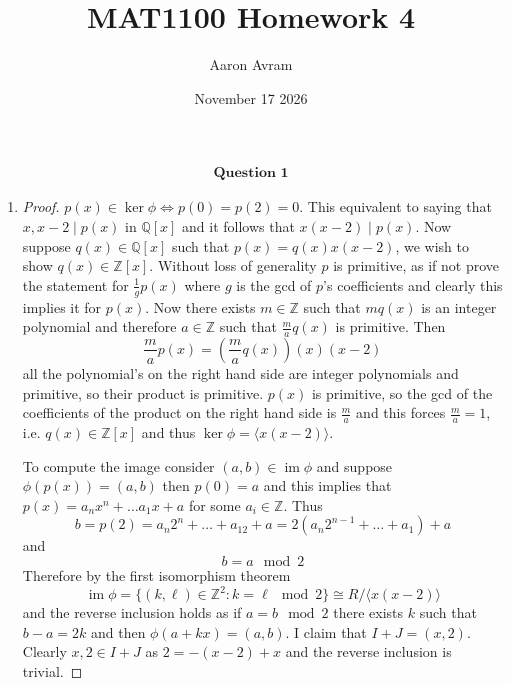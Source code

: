 \documentclass[12pt]{article}
\title{MAT1100 Homework 4}
\author{Aaron Avram}
\date{November 17 2026}
\begin{document}
\newtheorem{definition}{Definition}
\newtheorem{theorem}{Theorem}
\newtheorem{claim}{Claim}
\newtheorem{corollary}{Corollary}

\maketitle

\begin{align*}
    \textbf{Question 1}
\end{align*}

\begin{enumerate}
    \item[(i)]
    \begin{proof}
        $p(x) \in \ker \phi \iff p(0) = p(2) = 0$. This equivalent to saying
        that $x, x-2 \mid p(x)$ in $\mathbb Q[x]$ and it follows
        that $x(x-2) \mid p(x)$. Now suppose $q(x) \in \mathbb Q[x]$
        such that $p(x) = q(x)x(x-2)$, we wish to show $q(x) \in \mathbb Z[x]$. Without loss of generality $p$ is primitive,
        as if not prove the statement for $\frac{1}{g}p(x)$ where $g$ is the gcd of $p$'s
        coefficients and clearly this implies it for $p(x)$. Now there exists $m \in \mathbb Z$
        such that $mq(x)$ is an integer polynomial and therefore $a \in \mathbb Z$ such that
        $\frac{m}{a}q(x)$ is primitive. Then
        \[ \frac{m}{a}p(x) = (\frac{m}{a}q(x))(x)(x-2) \]
        all the polynomial's on the right hand side are integer polynomials and primitive, so their product is primitive.
        $p(x)$ is primitive, so the gcd of the coefficients of the product on the right hand side is $\frac{m}{a}$
        and this forces $\frac{m}{a} = 1$, i.e. $q(x) \in \mathbb Z[x]$ and thus $\ker \phi = \langle x(x-2) \rangle$.

        To compute the image consider $(a, b) \in \operatorname{im} \phi$ and suppose $\phi(p(x)) = (a, b)$
        then $p(0) = a$ and this implies that $p(x) = a_nx^n + \ldots a_1x + a$ for some $a_i \in \mathbb Z$.
        Thus
        \[ b = p(2) = a_n2^n + \ldots + a_12 + a = 2(a_n2^{n-1} + \ldots + a_1) + a \]
        and
        \[ b = a \mod 2 \]
        Therefore by the first isomorphism theorem
        \[ \operatorname{im} \phi = \{ (k, \ell) \in \mathbb Z^2 : k = \ell \mod 2 \} \cong R/\langle x(x-2) \rangle \]
        and the reverse inclusion holds as if $a = b \mod 2$ there exists $k$ such that $b - a = 2k$ and then $\phi(a + kx) = (a, b)$.
        I claim that $I + J = (x, 2)$. Clearly $x, 2 \in I + J$ as $2 = -(x-2) + x$
        and the reverse inclusion is trivial.


\end{proof}
\end{enumerate}
\end{document}

